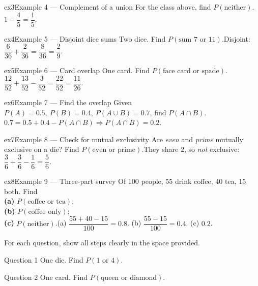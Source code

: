 \documentclass[11pt]{article}
\begin{document}
\begin{example}{ex3}{Example 4 --- Complement of a union}
For the class above, find $P(\text{neither})$.\soln $1-\dfrac45=\dfrac15$.
\end{example}

\begin{example}{ex4}{Example 5 --- Disjoint dice sums}
Two dice. Find $P(\text{sum }7\text{ or }11)$.\soln Disjoint: $\dfrac{6}{36}+\dfrac{2}{36}=\dfrac{8}{36}=\dfrac29$.
\end{example}

\begin{example}{ex5}{Example 6 --- Card overlap}
One card. Find $P(\text{face card or spade})$.\soln $\dfrac{12}{52}+\dfrac{13}{52}-\dfrac{3}{52}=\dfrac{22}{52}=\dfrac{11}{26}$.
\end{example}

\begin{example}{ex6}{Example 7 --- Find the overlap}
Given $P(A)=0.5,\ P(B)=0.4,\ P(A\cup B)=0.7$, find $P(A\cap B)$.\soln $0.7=0.5+0.4-P(A\cap B)\Rightarrow P(A\cap B)=0.2$.
\end{example}

\begin{example}{ex7}{Example 8 --- Check for mutual exclusivity}
Are \emph{even} and \emph{prime} mutually exclusive on a die? Find $P(\text{even or prime})$.\soln They share $2$, so \emph{not} exclusive: $\dfrac36+\dfrac36-\dfrac16=\dfrac56$.
\end{example}

\begin{example}{ex8}{Example 9 --- Three-part survey}
Of 100 people, 55 drink coffee, 40 tea, 15 both. Find \\ \textbf{(a)} $P(\text{coffee or tea})$; \\ \textbf{(b)} $P(\text{coffee only})$; \\ \textbf{(c)} $P(\text{neither})$.\soln (a) $\dfrac{55+40-15}{100}=0.8$. (b) $\dfrac{55-15}{100}=0.4$. (c) $0.2$.
\end{example}

\clearpage
{}
For each question, show all steps clearly in the space provided.

\begin{qbox}{Question 1}
One die. Find $P(1\text{ or }4)$.\workspace{2.4cm}
\end{qbox}

\begin{qbox}{Question 2}
One card. Find $P(\text{queen or diamond})$.\workspace{2.4cm}
\end{qbox}
\end{document}
